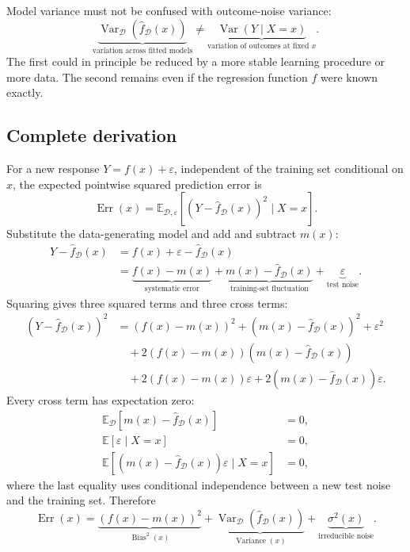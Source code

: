 \documentclass[11pt,a4paper]{article}
\newcommand{\ED}{\mathbb{E}_{\mathcal D}}
\newcommand{\VarD}{\operatorname{Var}_{\mathcal D}}
\begin{document}
Model variance must not be confused with outcome-noise variance:
\begin{equation}
  \underbrace{\VarD(\widehat f_{\mathcal D}(x))}_{\text{variation across fitted models}}
  \neq
  \underbrace{\operatorname{Var}(Y\mid X=x)}_{\text{variation of outcomes at fixed }x}.
\end{equation}
The first could in principle be reduced by a more stable learning procedure or more data. The second remains even if the regression function $f$ were known exactly.

\subsection{Complete derivation}

For a new response $Y=f(x)+\varepsilon$, independent of the training set conditional on $x$, the expected pointwise squared prediction error is
\begin{equation}
  \operatorname{Err}(x)
  =\mathbb E_{\mathcal D,\varepsilon}
   \left[\left(Y-\widehat f_{\mathcal D}(x)\right)^2\mid X=x\right].
\end{equation}
Substitute the data-generating model and add and subtract $m(x)$:
\begin{align}
  Y-\widehat f_{\mathcal D}(x)
  &=f(x)+\varepsilon-\widehat f_{\mathcal D}(x)\\
  &=\underbrace{f(x)-m(x)}_{\text{systematic error}}
    +\underbrace{m(x)-\widehat f_{\mathcal D}(x)}_{\text{training-set fluctuation}}
    +\underbrace{\varepsilon}_{\text{test noise}}.
\end{align}
Squaring gives three squared terms and three cross terms:
\begin{align}
  \left(Y-\widehat f_{\mathcal D}(x)\right)^2
  &=\left(f(x)-m(x)\right)^2
    +\left(m(x)-\widehat f_{\mathcal D}(x)\right)^2
    +\varepsilon^2 \nonumber\\
  &\quad+2\left(f(x)-m(x)\right)
             \left(m(x)-\widehat f_{\mathcal D}(x)\right) \nonumber\\
  &\quad+2\left(f(x)-m(x)\right)\varepsilon
    +2\left(m(x)-\widehat f_{\mathcal D}(x)\right)\varepsilon.
\end{align}
Every cross term has expectation zero:
\begin{align}
  \ED[m(x)-\widehat f_{\mathcal D}(x)]&=0,\\
  \mathbb E[\varepsilon\mid X=x]&=0,\\
  \mathbb E[(m(x)-\widehat f_{\mathcal D}(x))\varepsilon\mid X=x]&=0,
\end{align}
where the last equality uses conditional independence between a new test noise and the training set. Therefore
\begin{equation}
  \boxed{
  \operatorname{Err}(x)
  =\underbrace{\left(f(x)-m(x)\right)^2}_{\operatorname{Bias}^2(x)}
   +\underbrace{\VarD\left(\widehat f_{\mathcal D}(x)\right)}_{\operatorname{Variance}(x)}
   +\underbrace{\sigma^2(x)}_{\text{irreducible noise}}.}
  \label{eq:bv-pointwise}
\end{equation}
\end{document}
